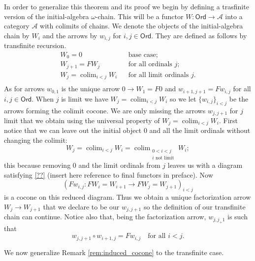 \documentclass[letterpaper, 11pt, oneside]{memoir}
\theoremstyle{myteo}
\numberwithin{equation}{section}
\DeclareMathOperator*\colim{colim}
\newcommand{\Ord}{\textsf{Ord}}
\newcommand{\A}{\mathscr{A}}
\begin{document}
In order to generalize this theorem and its proof we begin by defining a trasfinite version of the initial-algebra \(\omega\)-chain.
This will be a functor \(W : \Ord \to \A\) into a category \(\A\) with colimits of chains.
We denote the objects of the initial-algebra chain by \(W_i\) and the arrows by \(w_{i,j}\) for \(i,j \in \Ord\).
They are defined as follows by transfinite recursion.
\begin{align*}
  W_0 = 0 && \text{base case};\\
  W_{j+1} = FW_j && \text{for all ordinals \(j\)};\\
  W_j = \colim_{i < j}W_i && \text{for all limit ordinals \(j\)}.\\
\end{align*}
As for arrows \(w_{0,1}\) is the unique arrow \(0 \to W_1 = F0\) and \(w_{i + 1, j+1} = Fw_{i,j}\) for all \(i, j \in \Ord\).
When \(j\) is limit we have \(W_j = \colim_{i < j}W_i\) so we let \(\{w_{i,j}\}_{i < j}\) be the arrows forming the colimit cocone.
We are only missing the arrows \(w_{j, j+1}\) for \(j\) limit that we obtain using the universal property of \(W_j = \colim_{i < j}W_{i}\).
First notice that we can leave out the initial object \(0\) and all the limit ordinals without changing the colimit:
\begin{equation*}
  W_j = \colim_{i < j}W_i = \colim_{\substack{0 < i < j \\  \text{\(i\) not limit}}}W_i;
\end{equation*}
this because removing \(0\) and the limit ordinals from \(j\) leaves us with a diagram satisfying \ref{??} (insert here reference to final functors in preface).
Now
\begin{equation*}
  (Fw_{i,j} : FW_i = W_{i+1} \to FW_{j} = W_{j+1})_{i < j}
\end{equation*}
is a cocone on this reduced diagram.
Thus we obtain a unique factorization arrow \(W_j \to W_{j+1}\) that we declare to be our \(w_{j, j+1}\) so the definition of our transfinite chain can continue.
Notice also that, being the factorization arrow, \(w_{j, j_+1}\) is such that
\begin{equation}
  \label{eq:omega-to-omega-plus-one}
  w_{j, j+1} \circ w_{i+1, j} = Fw_{i, j} \quad \text{for all \(i < j\)}.
\end{equation}

We now generalize Remark \ref{rem:induced_cocone} to the transfinite case.
\end{document}
